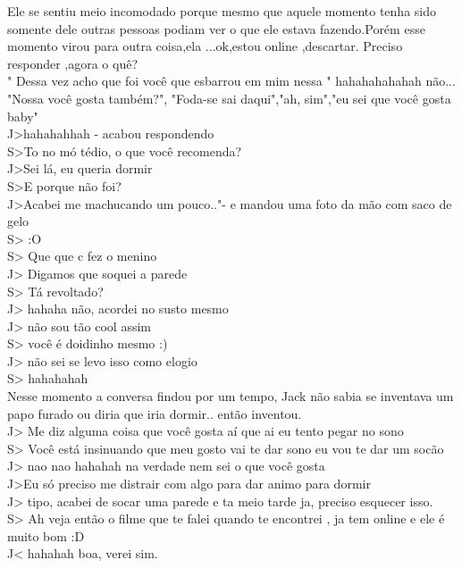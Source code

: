 \documentclass{book}
\begin{document}
 Ele se sentiu meio incomodado porque mesmo que aquele momento tenha sido somente dele outras pessoas podiam ver o que ele estava fazendo.Porém esse momento virou para outra coisa,ela ...ok,estou online ,descartar. Preciso responder ,agora o quê?\\
 " Dessa vez acho que foi você que esbarrou em mim nessa " hahahahahahah não...\\
 "Nossa você gosta também?", "Foda-se sai daqui","ah, sim","eu sei que você gosta baby"\\
 
 J>hahahahhah - acabou respondendo\\
 S>To no mó tédio, o que você recomenda?\\
 J>Sei lá, eu queria dormir\\
 S>E porque não foi?\\
 J>Acabei me machucando um pouco.."- e mandou uma foto da mão com saco de gelo\\
 S> :O\\
 S> Que que c fez o menino\\
 J> Digamos que soquei a parede\\
 S> Tá revoltado?\\
 J> hahaha não, acordei no susto mesmo\\
 J> não sou tão cool assim\\
 S> você é doidinho mesmo :) \\
 J> não sei se levo isso como elogio\\
 S> hahahahah\\
 
 Nesse momento a conversa findou por um tempo, Jack não sabia se inventava um papo furado ou diria que iria dormir.. então inventou.\\
 
 J> Me diz alguma coisa que você gosta aí que ai eu tento pegar no sono\\
 S> Você está insinuando que meu gosto vai te dar sono eu vou te dar um socão \\
 J> nao nao hahahah na verdade nem sei o que você gosta\\
 J>Eu só preciso me distrair com algo para dar animo para dormir\\
 J> tipo, acabei de socar uma parede e ta meio tarde ja, preciso esquecer isso.\\
 S> Ah veja então o filme que te falei quando te encontrei , ja tem online e ele é muito bom :D\\
 J< hahahah boa, verei sim.\\
 
\end{document}
